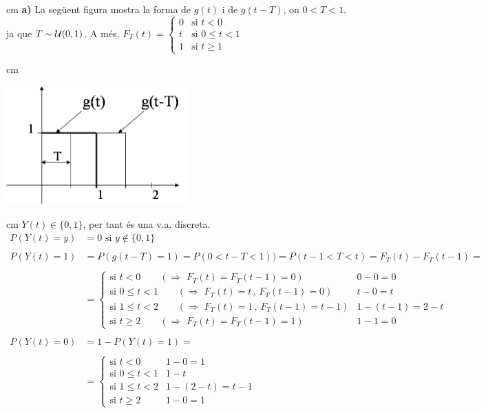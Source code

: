 \documentclass{article}
\begin{document}
 cm
\noindent
\textbf{a)} La seg\"uent figura mostra la forma de $g(t)$ i de $g(t-T)$,
on $0 < T < 1$, ja que $T \sim {\cal U}(0, 1)$. A m\'es, 
$F_T(t)=\begin{cases} 0 & \text{si } t < 0 \\ t & \text{si } 0 \leq t < 1 \\ 1 &  \text{si } t \geq 1 \end{cases}$

 cm
\begin{center}
\includegraphics[width=7cm]{figprob4T3.png}
\end{center}

 cm
$Y(t) \in \{0, 1\}$, per tant \'es una v.a. discreta. 
\[
\begin{array}{ll}
P(Y(t)=y)& = 0 \text{ si } y \notin \{0, 1 \} 
\\ \\
P(Y(t)=1)& = P(g(t-T)=1)=P(0 < t-T < 1))=P(t-1 < T < t) = F_T(t)-F_T(t-1)=\\ \\        
         & = \begin{cases} 
             \text{si } t < 0 \qquad (\Rightarrow \,\, F_T(t)=F_T(t-1)=0) & 0-0=0 \\
             \text{si } 0 \leq t < 1 \qquad (\Rightarrow \,\, F_T(t)=t \, , \, F_T(t-1)=0) & t-0=t \\
             \text{si } 1 \leq t < 2 \qquad (\Rightarrow \,\, F_T(t)=1 \, , \, F_T(t-1)=t-1) & 1-(t-1)=2-t \\
             \text{si } t \geq 2 \qquad (\Rightarrow \,\, F_T(t)=F_T(t-1)=1) & 1-1=0 
             \end{cases}
\\ \\
P(Y(t)=0)& = 1-P(Y(t)=1)= \\ \\
         & = \begin{cases} 
             \text{si } t < 0 & 1-0=1 \\
             \text{si } 0 \leq t < 1 & 1-t \\
             \text{si } 1 \leq t < 2 & 1-(2-t)=t-1 \\
             \text{si } t \geq 2 & 1-0=1 
             \end{cases}
\end{array}
\]
\end{document}
